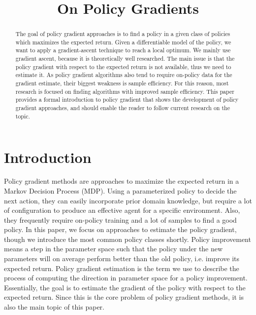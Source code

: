 \documentclass[conference, final]{IEEEtran}
\begin{document}
\title{On Policy Gradients}

\author{
}

\maketitle

\begin{abstract}

The goal of policy gradient approaches is to find a policy in a given class of policies which maximizes the expected return.
Given a differentiable model of the policy, we want to apply a gradient-ascent technique to reach a local optimum. 
We mainly use gradient ascent, because it is theoretically well researched.
The main issue is that the policy gradient with respect to the expected return is not available, thus we need to estimate it.
As policy gradient algorithms also tend to require on-policy data for the gradient estimate, their biggest weakness is sample efficiency.
For this reason, most research is focused on finding algorithms with improved sample efficiency.
This paper provides a formal introduction to policy gradient that shows the development of policy gradient approaches, and should enable the reader to follow current research on the topic.

\end{abstract}

\section{Introduction}
\label{intro}

Policy gradient methods are approaches to maximize the expected return in a Markov Decision Process (MDP). 
Using a parameterized policy to decide the next action, they can easily incorporate prior domain knowledge, but require a lot of configuration to produce an effective agent for a specific environment. 
Also, they frequently require on-policy training and a lot of samples to find a good policy. 
In this paper, we focus on approaches to estimate the policy gradient, though we introduce the most common policy classes shortly.
Policy improvement means a step in the parameter space such that the policy under the new parameters will on average perform better than the old policy, i.e. improve its expected return. 
Policy gradient estimation is the term we use to describe the process of computing the direction in parameter space for a policy improvement. 
Essentially, the goal is to estimate the gradient of the policy with respect to the expected return. 
Since this is the core problem of policy gradient methods, it is also the main topic of this paper.
\end{document}
